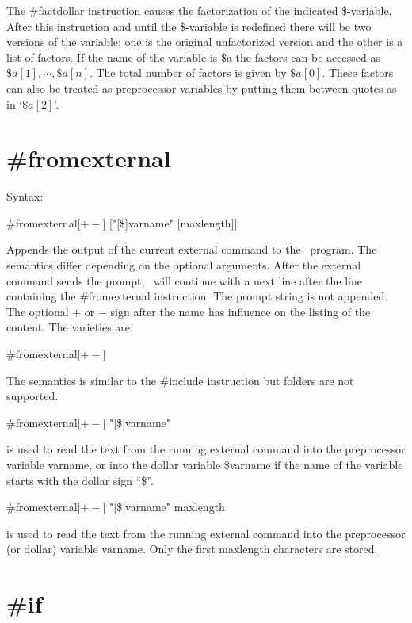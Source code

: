 \noindent The \#factdollar instruction causes the 
factorization of the indicated \$-variable. After this instruction and 
until the \$-variable is redefined there will be two versions of the 
variable: one is the original unfactorized version and the other is a list 
of factors. If the name of the variable is \$a the factors can be accessed 
as $\$a[1],\cdots,\$a[n]$. The total number of factors is given by 
$\$a[0]$. These factors can also be treated as preprocessor variables by 
putting them between quotes as in `$\$a[2]$'.


\section{\#fromexternal}
\label{prefromexternal}

\noindent Syntax:

\#fromexternal[$+-$] ["[\$]varname" [maxlength]]

\noindent Appends the output of the current external 
command to the \FORM\ program. The semantics differ depending on the optional 
arguments. After the external command sends the prompt, \FORM\ 
will continue with a next line after the line containing the \#fromexternal 
instruction. The prompt string is not appended. The optional $+$ or $-$ sign 
after the name has influence on the listing of the content. The varieties 
are:
                                                           
\#fromexternal[$+-$]

\noindent The semantics is similar to the \#include 
instruction but folders are not supported. 

\#fromexternal[$+-$] "[\$]varname"

\noindent is used to read the text from the running external command into 
the preprocessor variable varname, or into the dollar variable \$varname if 
the name of the variable starts with the dollar sign ``\$''.

\#fromexternal[$+-$] "[\$]varname" maxlength

\noindent is used to read the text from the running external command into 
the preprocessor (or dollar) variable varname. Only the first maxlength 
characters are stored.


\section{\#if}
\label{preif}

